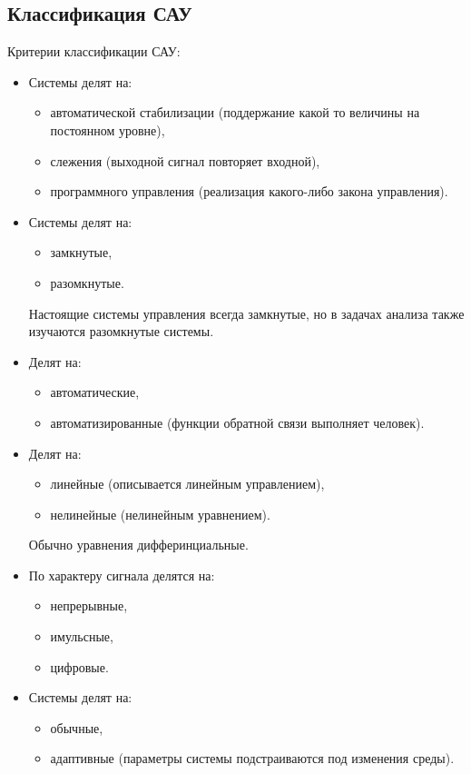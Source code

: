 \subsection{Классификация САУ}
Критерии классификации САУ:
\begin{itemize}
	\item Системы делят на:
		\begin{itemize}
			\item автоматической стабилизации (поддержание какой то величины на постоянном уровне),
			\item слежения (выходной сигнал повторяет входной),
			\item программного управления (реализация какого-либо закона управления).
		\end{itemize}
	\item Системы делят на:
		\begin{itemize}
			\item замкнутые,
			\item разомкнутые.
		\end{itemize}
		Настоящие системы управления всегда замкнутые, но в задачах анализа также изучаются разомкнутые системы.
	\item Делят на:
		\begin{itemize}
			\item автоматические,
			\item автоматизированные (функции обратной связи выполняет человек).
		\end{itemize}
	\item Делят на:
		\begin{itemize}
			\item линейные (описывается линейным управлением),
			\item нелинейные (нелинейным уравнением).
		\end{itemize}
		Обычно уравнения дифферинциальные.
	\item По характеру сигнала делятся на:
		\begin{itemize}
			\item непрерывные,
			\item имульсные,
			\item цифровые.
		\end{itemize}
	\item Системы делят на:
		\begin{itemize} 
			\item обычные,
			\item адаптивные (параметры системы подстраиваются под изменения среды).
		\end{itemize}
\end{itemize}

